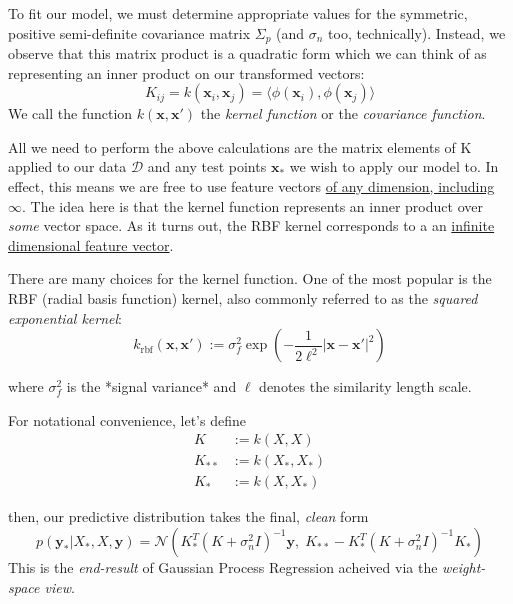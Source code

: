 To fit our model, we must determine appropriate values for the symmetric, positive semi-definite covariance matrix $\Sigma_p$ (and $\sigma_n$ too, technically). Instead, we observe that this matrix product is a quadratic form which we can think of as representing an inner product on our transformed vectors:
\begin{equation}
    K_{ij} = k(\mathbf{x}_i, \mathbf{x}_j) = \langle \phi(\mathbf{x}_i), \phi(\mathbf{x}_j)\rangle
\end{equation}
We call the function $k(\mathbf{x},\mathbf{x}')$ the \textit{kernel function} or the \textit{covariance function}.

All we need to perform the above calculations are the matrix elements of K applied to our data $\mathcal{D}$ and any test points $\mathbf{x}_*$ we wish to apply our model to. In effect, this means we are free to use feature vectors \href{https://www.youtube.com/watch?v=XUj5JbQihlU&t=25m53s}{of any dimension, including $\infty$}. The idea here is that the kernel function represents an inner product over \textit{some} vector space. As it turns out, the RBF kernel corresponds to a an \href{https://math.stackexchange.com/questions/276707/why-does-a-radial-basis-function-kernel-imply-an-infinite-dimension-map}{infinite dimensional feature vector}.

There are many choices for the kernel function. One of the most popular is the RBF (radial basis function) kernel, also commonly referred to as the \textit{squared exponential kernel}:
\begin{equation}
    k_{\text{rbf}}(\mathbf{x}, \mathbf{x}') := \sigma_f^2\exp(-\frac{1}{2\ell^2}\lvert \mathbf{x}-\mathbf{x}'\rvert^2)
\end{equation}

where $\sigma_f^2$ is the *signal variance* and $\ell$ denotes the similarity length scale.

For notational convenience, let's define
\begin{align}
    K &:= k(X,X) \\
    K_{**} &:= k(X_*, X_*) \\
    K_{*} &:= k(X, X_*)
\end{align}

then, our predictive distribution takes the final, \textit{clean} form
\begin{equation}
    \boxed{p(\mathbf{y}_* \vert X_*, X, \mathbf{y}) = \mathcal{N}\left( K_*^T(K+\sigma_n^2I)^{-1}\mathbf{y},\; K_{**}-K_{*}^T(K+\sigma_n^2I)^{-1}K_*\right)}
\end{equation}
This is the \textit{end-result} of Gaussian Process Regression acheived via the \textit{weight-space view}.


